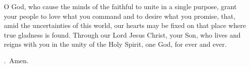 \lettrine[lines=3]{O}{} God, who cause the minds of the faithful
to unite in a single purpose,
grant your people to love what you command
and to desire what you promise,
that, amid the uncertainties of this world,
our hearts may be fixed on that place
where true gladness is found.
Through our Lord Jesus Christ, your Son,
who lives and reigns with you in the unity of the Holy Spirit,
one God, for ever and ever. \par \Rbar.~Amen.
